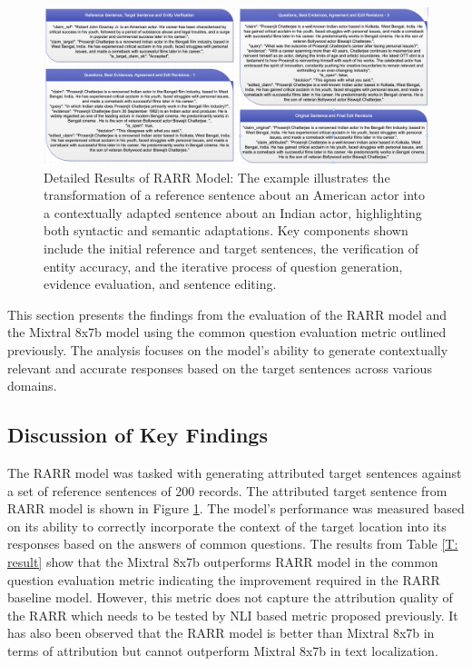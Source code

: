 \documentclass[11pt]{article}
\begin{document}
	\begin{figure}[tbh]
		\centering
		\includegraphics[width=\textwidth]{result}
		\caption{Detailed Results of RARR Model: The example illustrates the transformation of a reference sentence about an American actor into a contextually adapted sentence about an Indian actor, highlighting both syntactic and semantic adaptations. Key components shown include the initial reference and target sentences, the verification of entity accuracy, and the iterative process of question generation, evidence evaluation, and sentence editing.}
		\label{F:result}
	\end{figure}
	
	This section presents the findings from the evaluation of the RARR model and the Mixtral 8x7b model using the common question evaluation metric outlined previously. The analysis focuses on the model's ability to generate contextually relevant and accurate responses based on the target sentences across various domains.
	
	\subsection{Discussion of Key Findings}
	
	The RARR model was tasked with generating attributed target sentences against a set of reference sentences of 200 records. The attributed target sentence from RARR model is shown in Figure \ref{F:result}. The model's performance was measured based on its ability to correctly incorporate the context of the target location into its responses based on the answers of common questions. The results from Table \ref{T: result} show that the Mixtral 8x7b outperforms RARR model in the common question evaluation metric indicating the improvement required in the RARR baseline model. However, this metric does not capture the attribution quality of the RARR which needs to be tested by NLI based metric proposed previously. It has also been observed that the RARR model is better than Mixtral 8x7b in terms of attribution but cannot outperform Mixtral 8x7b in text localization.
	
\end{document}
